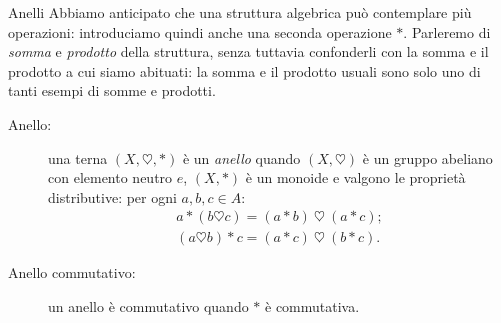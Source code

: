 		\begin{subsubsection}{Anelli}
			Abbiamo anticipato che una struttura algebrica può contemplare più operazioni: introduciamo quindi anche una seconda operazione $\ast$. Parleremo di \emph{somma} e \emph{prodotto} della struttura, senza tuttavia confonderli con la somma e il prodotto a cui siamo abituati: la somma e il prodotto usuali sono solo uno di tanti esempi di somme e prodotti.
			\begin{description}
				\item[Anello:] una terna $(X,\heartsuit,\ast)$ è un \emph{anello} quando $(X,\heartsuit)$ è un gruppo abeliano con elemento neutro $e$, $(X,\ast)$ è un monoide e valgono le proprietà distributive: per ogni $a,b,c\in A$:
				\begin{align*}
					a\ast(b\heartsuit c)=(a\ast b)\ \heartsuit\ (a\ast c); \\
					(a\heartsuit b)\ast c = (a\ast c)\ \heartsuit\ (b\ast c).
				\end{align*}
				
				\item[Anello commutativo:] un anello è commutativo quando $\ast$ è commutativa.


\end{description}
\end{subsubsection}
